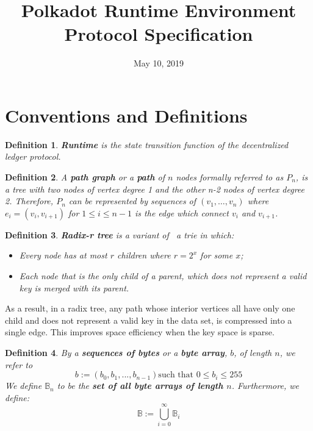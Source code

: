 \documentclass{article}
\newcommand{\assign}{:=}
\newcommand{\tmstrong}[1]{\textbf{#1}}
\newcommand{\tmtextbf}[1]{{\bfseries{#1}}}
\newcommand{\tmtexttt}[1]{{\ttfamily{#1}}}
\newcommand{\tmverbatim}[1]{{\ttfamily{#1}}}
\newtheorem{definition}{Definition}
\providecommand{\tmstrong}[1]{\tmtextbf{#1}}
\providecommand{\tmtextbf}[1]{\tmtextbf{#1}}
\providecommand{\tmverbatim}[1]{\tmtexttt{#1}}
\newtheorem{definition}{Definition}
\begin{document}
\title{
  Polkadot Runtime Environment\\
  {\Large Protocol Specification}
}

\date{May 10, 2019}

\maketitle

\section{Conventions and Definitions}

\begin{definition}
  {\tmstrong{Runtime}} is the state transition function of the decentralized
  ledger protocol.\tmverbatim{}
\end{definition}

\begin{definition}
  \label{def-path-graph}A {\tmstrong{path graph}} or a {\tmstrong{path}} of
  $n$ nodes formally referred to as {\tmstrong{$P_n$}}, is a tree with two
  nodes of vertex degree 1 and the other n-2 nodes of vertex degree 2.
  Therefore, $P_n$ can be represented by sequences of $(v_1, \ldots, v_n)$
  where $e_i = (v_i, v_{i + 1})$ for $1 \leqslant i \leqslant n - 1$ is the
  edge which connect $v_i$ and $v_{i + 1}$.
\end{definition}

\begin{definition}
  \label{defn-radix-tree}{\tmstrong{Radix-r tree}} is a variant of \ a trie in
  which:
  \begin{itemize}
    \item Every node has at most $r$ children where $r = 2^x$ for some $x$;
    
    \item Each node that is the only child of a parent, which does not
    represent a valid key is merged with its parent.
  \end{itemize}
\end{definition}

As a result, in a radix tree, any path whose interior vertices all have only
one child and does not represent a valid key in the data set, is compressed
into a single edge. This improves space efficiency when the key space is
sparse.

\begin{definition}
  By a {\tmstrong{sequences of bytes}} or a {\tmstrong{byte array}}, $b$, of
  length $n$, we refer to
  \[ b \assign (b_0, b_1, ..., b_{n - 1})  \text{such that } 0 \leqslant b_i
     \leqslant 255 \]
  We define $\mathbb{B}_n$ to be the {\tmstrong{set of all byte arrays of
  length $n$}}. Furthermore, we define:
  \[ \mathbb{B} \assign \bigcup^{\infty}_{i = 0} \mathbb{B}_i \]
\end{definition}
\end{document}
